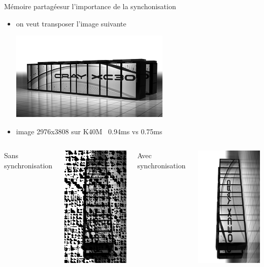 \documentclass[11pt,mathserif]{beamer}
\newcommand{\gezi}{\faLongArrowRight}
\begin{document}
\begin{frame}{Mémoire partagée}{sur l'importance de la synchonisation}
 \begin{itemize}[<+->]
   \item on veut transposer l'image suivante
\begin{center}
  \includegraphics[width=0.4\linewidth]{fig/cray.png}
\end{center}
  \item[\faClockO] image 2976x3808 sur K40M \gezi\ 0.94ms vs 0.75ms 
\end{itemize}
\pause
\begin{columns}[t]
\column{5cm}
 Sans synchronisation 
\begin{center}
  \includegraphics[width=0.3\linewidth]{fig/crayNoSync.png}
\end{center}
\column{5cm}
 Avec synchronisation
\begin{center}
  \includegraphics[width=0.3\linewidth]{fig/crayTrans.png}
\end{center}
\end{columns}
\end{frame}
\end{document}
